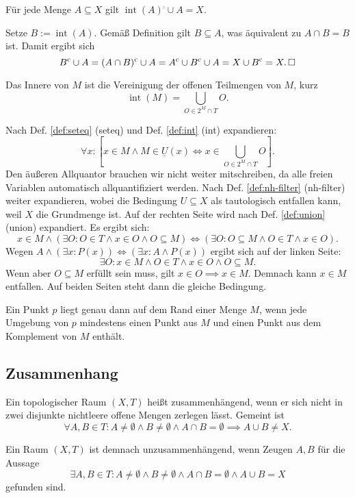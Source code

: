 \begin{Satz}
Für jede Menge $A\subseteq X$ gilt $\operatorname{int}(A)^\comp\cup A = X$.
\end{Satz}
\begin{Beweis}
Setze $B:=\operatorname{int}(A)$. Gemäß Definition gilt $B\subseteq A$,
was äquivalent zu $A\cap B = B$ ist. Damit ergibt sich
\[B^\mathrm c\cup A = (A\cap B)^\mathrm c\cup A = A^\mathrm c\cup B^\mathrm c\cup A
= X\cup B^\mathrm c = X.\,\square\]
\end{Beweis}

\begin{Satz}
Das Innere von $M$ ist die Vereinigung der offenen Teilmengen
von $M$, kurz%
\[\operatorname{int}(M) = \bigcup_{O\in 2^M\cap T} O.\]
\end{Satz}

\begin{Beweis}
Nach Def. \ref{def:seteq} (seteq) und Def. \ref{def:int} (int)
expandieren:%
\[\forall x\colon [x\in M\land M\in\underline U(x)
\iff x\in\bigcup_{O\in 2^M\cap T} O].\]
Den äußeren Allquantor brauchen wir nicht weiter mitschreiben, da alle
freien Variablen automatisch allquantifiziert werden.
Nach Def. \ref{def:nh-filter} (nh-filter) weiter expandieren, wobei die
Bedingung $U\subseteq X$ als tautologisch entfallen kann,
weil $X$ die Grundmenge ist. Auf der rechten Seite wird nach Def.
\ref{def:union} (union) expandiert. Es ergibt sich:
\[x\in M\land (\exists O\colon O\in T\land x\in O\land O\subseteq M)
\iff (\exists O\colon O\subseteq M\land O\in T\land x\in O).\]
Wegen $A\land(\exists x\colon P(x))\iff (\exists x\colon A\land P(x))$ ergibt
sich auf der linken Seite:
\[\exists O\colon x\in M\land O\in T\land x\in O\land O\subseteq M.\]
Wenn aber $O\subseteq M$ erfüllt sein muss, gilt
$x\in O\implies x\in M$. Demnach kann $x\in M$ entfallen.
Auf beiden Seiten steht dann die gleiche Bedingung.\,\qedsymbol
\end{Beweis}

\begin{Satz}\label{boundary-point-char}
Ein Punkt $p$ liegt genau dann auf dem Rand einer Menge $M$, wenn
jede Umgebung von $p$ mindestens einen Punkt aus $M$ und
einen Punkt aus dem Komplement von $M$ enthält.
\end{Satz}

\newpage
\subsection{Zusammenhang}

\begin{Definition}\newlinefirst
Ein topologischer Raum $(X,T)$ heißt zusammenhängend, wenn er sich
nicht in zwei disjunkte nichtleere offene Mengen zerlegen lässt. Gemeint ist
\[\forall A,B\in T\colon A\ne\emptyset\land B\ne\emptyset\land A\cap B = \emptyset \implies A\cup B\ne X.\]
\end{Definition}
 Ein Raum $(X,T)$ ist demnach unzusammenhängend, wenn
Zeugen $A,B$ für die Aussage
\[\exists A,B\in T\colon A\ne\emptyset\land B\ne\emptyset\land A\cap B = \emptyset \land A\cup B = X\]
gefunden sind.

